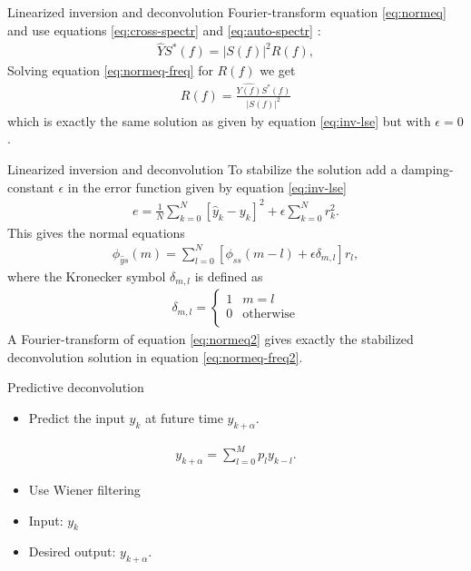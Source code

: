 \documentclass[xcolor=dvipsnames,notes]{beamer}
\begin{document}
%
\begin{frame}{Linearized inversion and deconvolution}
Fourier-transform equation \eqref{eq:normeq} and use
equations \eqref{eq:cross-spectr} and \eqref{eq:auto-spectr} :
%
\begin{eqnarray}
\hat{Y} S^*(f)= |S(f)|^2 R(f),
            \label{eq:normeq-freq}
\end{eqnarray}
% 
Solving equation \eqref{eq:normeq-freq} for $R(f)$ we get
%
\begin{eqnarray}
R(f) = \frac{\hat{Y(f)}S^*(f)}{|S(f)|^2}
            \label{eq:normeq-freq2}
\end{eqnarray}
% 
which is exactly the same solution as  given by equation \eqref{eq:inv-lse} but with $\epsilon=0$.
\end{frame}
%
\begin{frame}{Linearized inversion and deconvolution}
To stabilize the solution add a damping-constant $\epsilon$ in the error function
given by equation \eqref{eq:inv-lse} 
%
\begin{eqnarray}
  e = \frac{1}{N}\sum^{N}_{k=0} [\hat{y}_k-y_k]^2 +\epsilon\sum^{N}_{k=0}r^2_k.
                       \label{eq:inv-lse-damp}
\end{eqnarray}
%
This gives the normal equations
%
\begin{eqnarray}
\phi_{\hat{y} s}(m)= \sum^N_{l=0}[\phi_{s s}(m-l)+\epsilon\delta_{m,l}] r_l,
            \label{eq:normeq2}
\end{eqnarray}
% 
where the Kronecker symbol $\delta_{m,l}$ is defined as
%
\begin{eqnarray}
\delta_{m,l}=\left\{ \begin{array}{ll}
                       1 & \mbox{$m=l$} \\
                       0 & \mbox{otherwise}\\ 
                     \end{array}
             \right.
\end{eqnarray}
%
A Fourier-transform of equation \eqref{eq:normeq2} gives exactly the
stabilized deconvolution solution in equation \eqref{eq:normeq-freq2}.
\end{frame}
%
\begin{frame}{Predictive deconvolution}
%
\begin{itemize}
\item Predict the input $y_k$ at future time $y_{k+\alpha}$.
\end{itemize}
%
\begin{eqnarray}
  y_{k+\alpha}=\sum^M_{l=0}p_l y_{k-l}. 
                         \label{eq:pred}
\end{eqnarray}
%
\begin{itemize}
  \item Use Wiener filtering
  \item Input: $y_k$ 
  \item Desired output: $y_{k+\alpha}$.
\end{itemize}
\end{frame}
\end{document}
